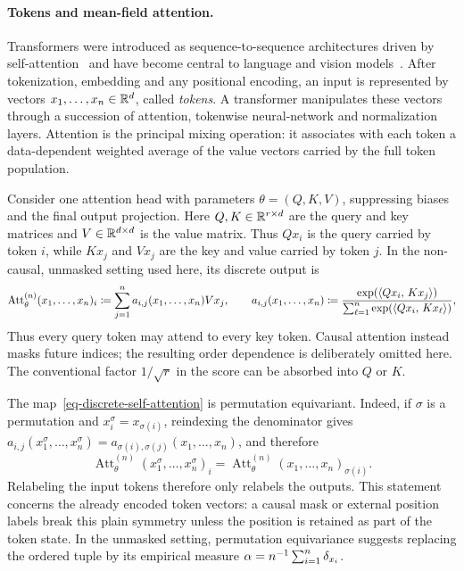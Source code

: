 \paragraph{Tokens and mean-field attention.}
Transformers were introduced as sequence-to-sequence architectures driven by self-attention~\citep{Vaswani2017Attention} and have become central to language and vision models~\citep{Brown2020LanguageModels,Dosovitskiy2021Image}. After tokenization, embedding and any positional encoding, an input is represented by vectors \(x_1,\ldots,x_n\in\mathbb{R}^d\), called \emph{tokens}. A transformer manipulates these vectors through a succession of attention, tokenwise neural-network and normalization layers. Attention is the principal mixing operation: it associates with each token a data-dependent weighted average of the value vectors carried by the full token population.

Consider one attention head with parameters \(\theta=(Q,K,V)\), suppressing biases and the final output projection. Here \(Q,K\in\mathbb{R}^{r\times d}\) are the query and key matrices and \(V\in\mathbb{R}^{d\times d}\) is the value matrix. Thus \(Qx_i\) is the query carried by token \(i\), while \(Kx_j\) and \(Vx_j\) are the key and value carried by token \(j\). In the non-causal, unmasked setting used here, its discrete output is
\begin{equation}\label{eq-discrete-self-attention}
	\operatorname{Att}^{(n)}_\theta(x_1,\ldots,x_n)_i
	\coloneqq
	\sum_{j=1}^n a_{i,j}(x_1,\ldots,x_n)Vx_j,
	\qquad
	a_{i,j}(x_1,\ldots,x_n)
	\coloneqq
	\frac{\exp(\langle Qx_i,\,Kx_j\rangle)}
	{\sum_{\ell=1}^n\exp(\langle Qx_i,\,Kx_\ell\rangle)},
\end{equation}
Thus every query token may attend to every key token. Causal attention instead masks future indices; the resulting order dependence is deliberately omitted here. The conventional factor \(1/\sqrt r\) in the score can be absorbed into \(Q\) or \(K\).

The map~\eqref{eq-discrete-self-attention} is permutation equivariant. Indeed, if \(\sigma\) is a permutation and \(x_i^\sigma=x_{\sigma(i)}\), reindexing the denominator gives \(a_{i,j}(x_1^\sigma,\ldots,x_n^\sigma)=a_{\sigma(i),\sigma(j)}(x_1,\ldots,x_n)\), and therefore
\[
	\operatorname{Att}^{(n)}_\theta(x_1^\sigma,\ldots,x_n^\sigma)_i
	=
	\operatorname{Att}^{(n)}_\theta(x_1,\ldots,x_n)_{\sigma(i)}.
\]
Relabeling the input tokens therefore only relabels the outputs. This statement concerns the already encoded token vectors: a causal mask or external position labels break this plain symmetry unless the position is retained as part of the token state. In the unmasked setting, permutation equivariance suggests replacing the ordered tuple by its empirical measure \(\alpha=n^{-1}\sum_{i=1}^n\delta_{x_i}\).


